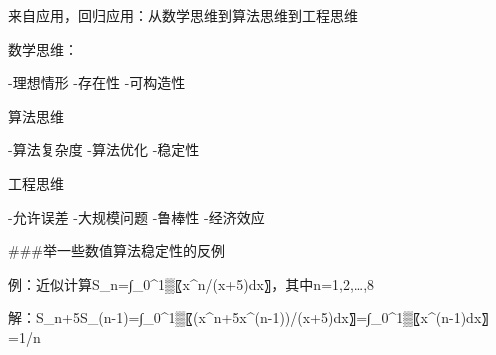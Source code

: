 来自应用，回归应用：从数学思维到算法思维到工程思维

数学思维：

-理想情形
-存在性
-可构造性

算法思维

-算法复杂度
-算法优化
-稳定性

工程思维

-允许误差
-大规模问题
-鲁棒性
-经济效应





###举一些数值算法稳定性的反例



例：近似计算S_n=∫_0^1▒〖x^n/(x+5)dx〗，其中n=1,2,…,8

解：S_n+5S_(n-1)=∫_0^1▒〖(x^n+5x^(n-1))/(x+5)dx〗=∫_0^1▒〖x^(n-1)dx〗=1/n